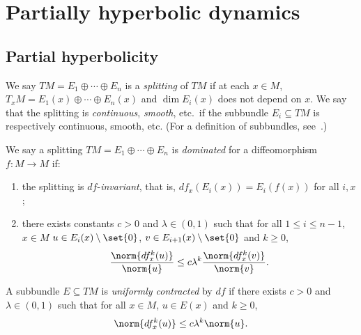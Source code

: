 \documentclass[../main]{subfiles}
\begin{document}
\chapter{Partially hyperbolic dynamics}\label{cha:part-hyperb-dynam}

\section{Partial hyperbolicity}

\begin{definition}[Splitting]
  We say \(TM = E_1\oplus \cdots \oplus E_n\) is a \emph{splitting} of \(TM\) if at each \(x \in M\), \(T_xM = E_1(x)\oplus \cdots \oplus E_n(x)\) and \(\dim E_i(x)\) does not depend on \(x\). We say that the splitting is \emph{continuous}, \emph{smooth}, etc.\ if the subbundle \(E_i \subseteq TM\) is respectively continuous, smooth, etc. (For a definition of subbundles, see~\cite[pp. 264]{leeIntroductionSmoothManifolds2012}.)
\end{definition}

\begin{definition}
  We say a splitting \(TM = E_1\oplus \cdots \oplus E_n\) is \emph{dominated} for a diffeomorphism \(f \colon M \to M\) if:
  \begin{enumerate}
  \item the splitting is \(df\)-\emph{invariant}, that is, \(df_x(E_i(x)) = E_i(f(x))\) for all \(i,x\);
  \item there exists constants \(c > 0\) and \(\lambda \in (0,1)\) such that for all \(1 \le i \le n - 1\), \(x \in M\) \(u \in E_i(x) \setminus \set{0}\), \(v \in E_{i + 1}(x) \setminus \set{0}\) and \(k \ge 0\),
    \begin{equation*}
      \frac{\norm{df^k_x(u)}}{\norm{u}} \le c \lambda^k \frac{\norm{df^k_x(v)}}{\norm{v}}.
    \end{equation*}
  \end{enumerate}
\end{definition}

\begin{definition}
  A subbundle \(E \subseteq TM\) is \emph{uniformly contracted} by \(df\) if there exists \(c > 0\) and \(\lambda \in (0,1)\) such that for all \(x \in M\), \(u \in E(x)\) and \(k \ge 0\),
  \begin{equation*}
    \norm{df^k_x(u)} \le c \lambda^k \norm{u}.
  \end{equation*}
\end{definition}
\end{document}
